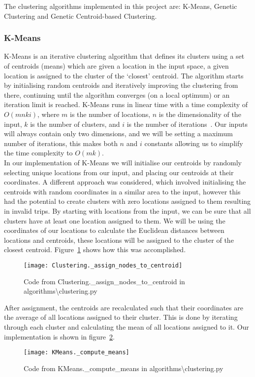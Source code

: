 \noindent
The clustering algorithms implemented in this project are: K-Means, Genetic Clustering and Genetic Centroid-based
Clustering.

\subsubsection{K-Means}\label{subsubsec:k-means}
K-Means is an iterative clustering algorithm that defines its clusters using a set of centroids (means) which are
given a location in the input space, a given location is assigned to the cluster of the `closest' centroid.
The algorithm starts by initialising random centroids and iteratively improving the clustering from there, continuing
until the algorithm converges (on a local optimum) or an iteration limit is reached.
K-Means runs in linear time with a time complexity of $O(m n k i)$, where $m$ is the number of locations, $n$ is the
dimensionality of the input, $k$ is the number of clusters, and $i$ is the number of iterations~\parencite[p. 102]{hartigan1979algorithm}.
Our inputs will always contain only two dimensions, and we will be setting a maximum number of iterations, this
makes both $n$ and $i$ constants allowing us to simplify the time complexity to $O(m k)$.\\

\noindent
In our implementation of K-Means we will initialise our centroids by randomly selecting unique locations from our
input, and placing our centroids at their coordinates.
A different approach was considered, which involved initialising the centroids with random coordinates in a similar
area to the input, however this had the potential to create clusters with zero locations assigned to them resulting
in invalid trips.
By starting with locations from the input, we can be sure that all clusters have at least one location assigned to them.
We will be using the coordinates of our locations to calculate the Euclidean distances between locations and centroids,
these locations will be assigned to the cluster of the closest centroid.
Figure~\ref{fig:Clustering._assign_nodes_to_centroid} shows how this was accomplished.
\begin{figure}[H]
    \centering
    \texttt{[image: Clustering.\_assign\_nodes\_to\_centroid]}
    \caption{Code from Clustering.\_assign\_nodes\_to\_centroid in algorithms\textbackslash clustering.py}
    \label{fig:Clustering._assign_nodes_to_centroid}
\end{figure}

\noindent
After assignment, the centroids are recalculated such that their coordinates are the average of all locations
assigned to their cluster.
This is done by iterating through each cluster and calculating the mean of all locations assigned to it.
Our implementation is shown in figure~\ref{fig:KMeans._compute_means}.
\begin{figure}[H]
    \centering
    \texttt{[image: KMeans.\_compute\_means]}
    \caption{Code from KMeans.\_compute\_means in algorithms\textbackslash clustering.py}
    \label{fig:KMeans._compute_means}
\end{figure}

